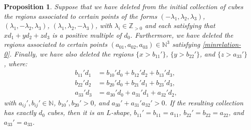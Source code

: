 \documentclass[12pt]{article}
\newtheorem{prop}[thm]{Proposition}
\theoremstyle{remark}
\begin{document}
\begin{prop}\label{propminimalrelations}
     Suppose that we have deleted from the initial collection of cubes the regions associated to certain points of the forms $(-\lambda_1,\lambda_2,\lambda_3)$, $(\lambda_1,-\lambda_2,\lambda_3)$, $(\lambda_1,\lambda_2,-\lambda_3)$, with $\lambda_i \in \mathbb{Z}_{>0}$ and each satisfying that $xd_1 + yd_2 + zd_3$ is a positive multiple of $d_0$. Furthermore, we have deleted the regions associated to certain points $(a_{01},a_{02},a_{03}) \in \mathbb{N}^3$ satisfying \eqref{minrelation-0}. Finally, we have also deleted the regions $\{x > b_{11}'\}$, $\{y > b_{22}'\}$, and $\{z > a_{33}'\}$, where: 
    \begin{align*}
        b_{11}'d_1 &= b_{10}'d_0 + b_{12}'d_2 + b_{13}'d_3,   \\
        b_{22}'d_2 &= b_{20}'d_0 + b_{21}'d_1 + b_{23}'d_3,   \\
        a_{33}'d_3 &= a_{30}'d_0 + a_{31}'d_1 + a_{32}'d_2, 
    \end{align*}
    with $a_{ij}',b_{ij}' \in \mathbb{N}$, $b_{10}',b_{20}' >0$, and $a_{30}' + a_{31}'a_{32}' > 0$. If the resulting collection has exactly $d_0$ cubes, then it is an $L$-shape, $b_{11}' = b_{11} = a_{11}$, $b_{22}'=b_{22}=a_{22}$, and $a_{33}' = a_{33}$.
\end{prop}
\end{document}
